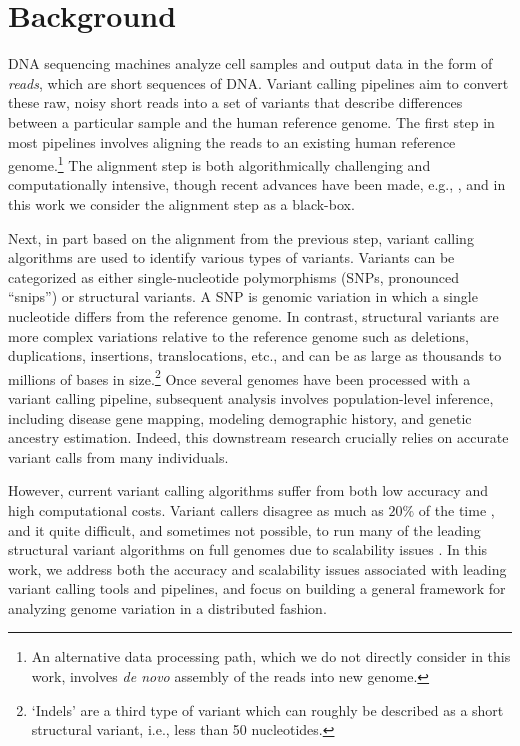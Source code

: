 \documentclass[10pt]{article}
\begin{document}
\section{Background}

DNA sequencing machines analyze cell samples and output data in the form of
\emph{reads}, which are short sequences of DNA.  Variant calling pipelines aim
to convert these raw, noisy short reads into a set of variants that describe
differences between a particular sample and the human reference genome. The
first step in most pipelines involves aligning the reads to an existing human
reference genome.\footnote{An alternative data processing path, which we do not
directly consider in this work, involves \emph{de novo} assembly of the reads
into new genome.} The alignment step is both algorithmically challenging and
computationally intensive, though recent advances have been made, e.g.,
\cite{snap}, and in this work we consider the alignment step as a black-box.

Next, in part based on the alignment from the previous step, variant calling
algorithms are used to identify various types of variants.  Variants can be
categorized as either single-nucleotide polymorphisms (SNPs, pronounced
``snips'') or structural variants.  A SNP is genomic variation in which a
single nucleotide differs from the reference genome.  In contrast, structural
variants are more complex variations relative to the reference genome such as
deletions, duplications, insertions, translocations, etc., and can be as large
as thousands to millions of bases in size.\footnote{`Indels' are a third type
of variant which can roughly be described as a short structural variant, i.e.,
less than 50 nucleotides.} 
Once several genomes have been processed with a variant calling pipeline,
subsequent analysis involves population-level inference, including disease gene
mapping, modeling demographic history, and genetic ancestry estimation. Indeed,
this downstream research crucially relies on accurate variant calls from many
individuals.  

However, current variant calling algorithms suffer from both low accuracy and
high computational costs. Variant callers disagree as much as $20\%$ of the
time \cite{haussler}, and it quite difficult, and sometimes not possible, to
run many of the leading structural variant algorithms on full genomes due to
scalability issues \cite{kristalcurtis}.  In this work, we address both the
accuracy and scalability issues associated with leading variant calling tools
and pipelines, and focus on building a general framework for analyzing genome
variation in a distributed fashion.  
\end{document}
